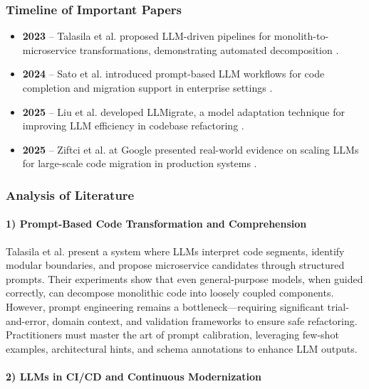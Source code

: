 \documentclass[12pt]{article}
\begin{document}
\subsubsection{Timeline of Important Papers}

\begin{itemize}
    \item \textbf{2023} – Talasila et al. proposed LLM-driven pipelines for monolith-to-microservice transformations, demonstrating automated decomposition \cite{talasila2023}.
    \item \textbf{2024} – Sato et al. introduced prompt-based LLM workflows for code completion and migration support in enterprise settings \cite{sato2024}.
    \item \textbf{2025} – Liu et al. developed LLMigrate, a model adaptation technique for improving LLM efficiency in codebase refactoring \cite{llmigrate2025}.
    \item \textbf{2025} – Ziftci et al. at Google presented real-world evidence on scaling LLMs for large-scale code migration in production systems \cite{googlemigrate2025}.
\end{itemize}

\subsubsection{Analysis of Literature}

\paragraph{1) Prompt-Based Code Transformation and Comprehension}

Talasila et al. \cite{talasila2023} present a system where LLMs interpret code segments, identify modular boundaries, and propose microservice candidates through structured prompts. Their experiments show that even general-purpose models, when guided correctly, can decompose monolithic code into loosely coupled components. However, prompt engineering remains a bottleneck—requiring significant trial-and-error, domain context, and validation frameworks to ensure safe refactoring. Practitioners must master the art of prompt calibration, leveraging few-shot examples, architectural hints, and schema annotations to enhance LLM outputs.

\paragraph{2) LLMs in CI/CD and Continuous Modernization}
\end{document}
